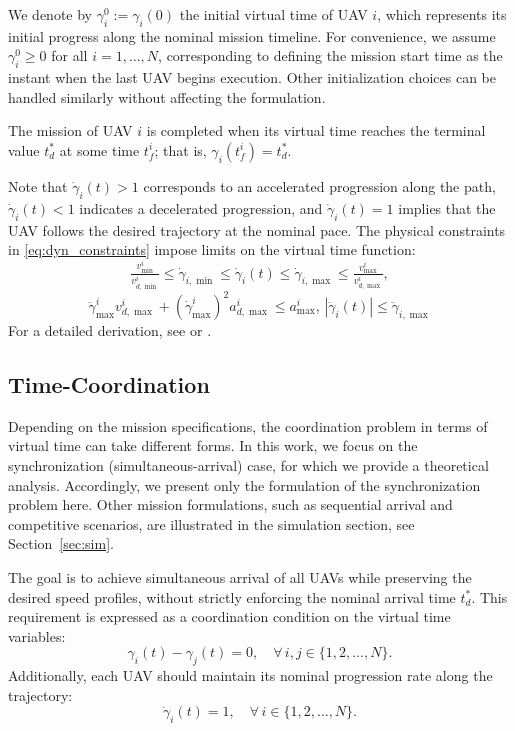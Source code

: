\documentclass[letterpaper,journal]{IEEEtran}
\begin{document}
We denote by $\gamma_i^0 := \gamma_i(0)$ the initial virtual time of UAV $i$, which represents its initial progress along the nominal mission timeline. For convenience, we assume $\gamma_i^0 \geq 0$ for all $i = 1, \dots, N$, corresponding to defining the mission start time as the instant when the last UAV begins execution. Other initialization choices can be handled similarly without affecting the formulation. 

The mission of UAV $i$ is completed when its virtual time reaches the terminal value $t_d^*$ at some time $t_f^i$; that is, $\gamma_i(t_f^i)=t_d^*$.

Note that $\dot{\gamma}_i(t) > 1$ corresponds to an accelerated progression along the path, $\dot{\gamma}_i(t) < 1$ indicates a decelerated progression, and $\dot{\gamma}_i(t) = 1$ implies that the UAV follows the desired trajectory at the nominal pace. The  physical constraints in \eqref{eq:dyn_constraints}  impose limits on the  virtual time function:
\begin{equation}\label{gammadotconst}
\tfrac{v_{\min }^i}{v_{d, \min }^i} \leq \dot{\gamma}_{i,\min} \leq \dot{\gamma}_i(t) \leq \dot{\gamma}_{i,\max} \leq \tfrac{v_{\max }^i}{v_{d, \max }^i},
\end{equation}
\begin{equation}\label{gammaddotconst}
\ddot{\gamma}_{\max }^i v_{d, \max }^i+\left(\dot{\gamma}_{\max }^i\right)^2 a_{d, \max }^i \leq a_{\max }^i, \, |\ddot{\gamma}_i(t)| \leq \ddot{\gamma}_{i,\max}
\end{equation}
For a detailed derivation, see \cite{kaminer2017time} or \cite{cichella20133d}.



\subsection{Time-Coordination}\label{time-coordination-objective}

Depending on the mission specifications, the coordination problem in terms of virtual time can take different forms. In this work, we focus on the synchronization (simultaneous-arrival) case, for which we provide a theoretical analysis. Accordingly, we present only the formulation of the synchronization problem here. Other mission formulations, such as sequential arrival and competitive scenarios, are illustrated in the simulation section, see Section~\ref{sec:sim}.

The goal is to achieve simultaneous arrival of all UAVs while preserving the desired speed profiles, without strictly enforcing the nominal arrival time $t_d^*$.
This requirement is expressed as a coordination condition on the virtual time variables:
\begin{equation}\label{def-syn} \gamma_i(t) - \gamma_j(t) = 0, \quad \forall \, i, j \in \{1, 2, \dots, N\}. 
\end{equation}
Additionally, each UAV should maintain its nominal progression rate along the trajectory:
\begin{equation}\label{def-pace-keep} \dot{\gamma}_i(t) = 1, \quad \forall \,i \in \{1, 2, \dots, N\}. \end{equation}
  
\end{document}
